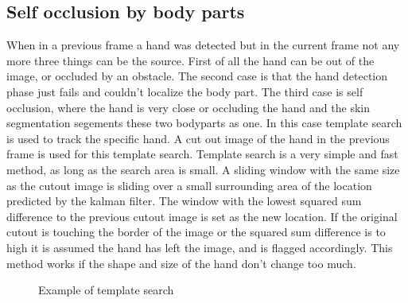 \subsection*{Self occlusion by body parts}
When in a previous frame a hand was detected but in the current frame not any more three things can be the source. First of all the hand can be out of the image, or occluded by an obstacle. The second case is that the hand detection phase just fails and couldn't localize the body part. The third case is self occlusion, where the hand is very close or occluding the hand and the skin segmentation segements these two bodyparts as one. In this case template search is used to track the specific hand. A cut out image of the hand in the previous frame is used for this template search. Template search is a very simple and fast method, as long as the search area is small. A sliding window  with the same size as the cutout image is sliding over a small surrounding area of the location predicted by the kalman filter. The window with the lowest squared sum difference to the previous cutout image is set as the new location. If the original cutout is touching the border of the image or the squared sum difference is to high it is assumed the hand has left the image, and is flagged accordingly. This method works if the shape and size of the hand don't change too much.

\begin{figure}[htbp]
\begin{center}
\hspace{0.03\linewidth}
\end{center}
\caption{Example of template search}
\label{fig:templatesearch}
\end{figure}

